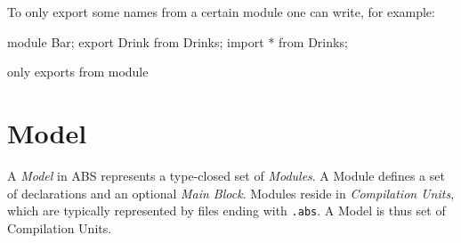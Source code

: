 To only export some names from a certain module one can write, for example:
\begin{abscode}
module Bar;
export Drink from Drinks;
import * from Drinks;
\end{abscode}
only exports  from module 

\section{Model}
\label{sec:model}
A \emph{Model} in ABS represents a type-closed set of \emph{Modules}.
A Module defines a set of declarations and an optional \emph{Main Block}.
Modules reside in \emph{Compilation Units}, which are typically represented by files ending with \texttt{.abs}.
A Model is thus set of Compilation Units.

\begin{abssyntax}
            {}\\
  {}
\end{abssyntax}










